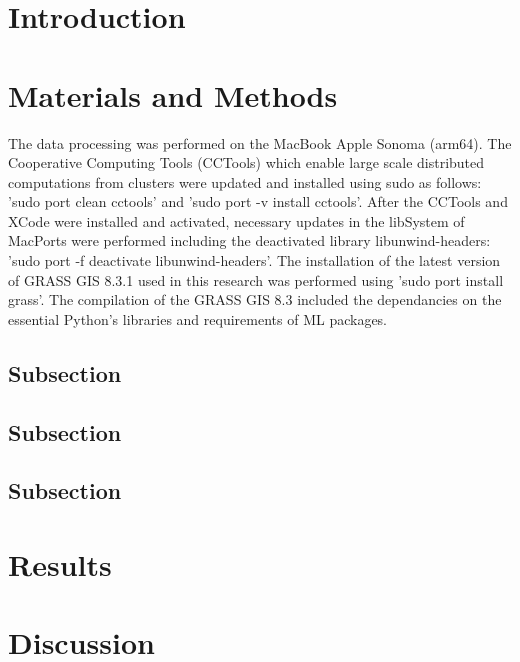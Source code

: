 \documentclass[coasts,article,submit,pdftex,moreauthors]{Definitions/mdpi}
\begin{document}
\section{Introduction}

\section{Materials and Methods}

The data processing was performed on the MacBook Apple Sonoma (arm64). The Cooperative Computing Tools (CCTools) which enable large scale distributed computations from clusters were updated and installed using sudo as follows: 'sudo port clean cctools' and 'sudo port -v install cctools'. After the CCTools and XCode were installed and activated, necessary updates in the libSystem of MacPorts were performed including the deactivated library libunwind-headers: 'sudo port -f deactivate libunwind-headers'. The installation of the latest version of GRASS GIS 8.3.1 used in this research was performed using 'sudo port install grass'. The compilation of the GRASS GIS 8.3 included the dependancies on the essential Python's libraries and requirements of ML packages.

\subsection{Subsection}

\subsection{Subsection}

\subsection{Subsection}

\section{Results}

\section{Discussion}
\end{document}
